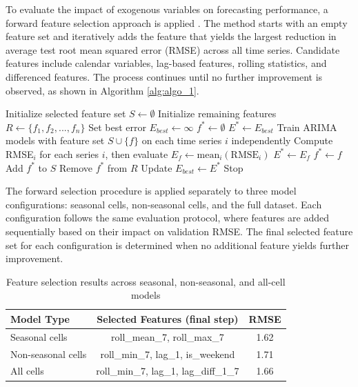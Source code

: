 To evaluate the impact of exogenous variables on forecasting performance, a forward feature selection approach is applied \cite{intro_to_ML}. The method starts with an empty feature set and iteratively adds the feature that yields the largest reduction in average test root mean squared error (RMSE) across all time series. Candidate features include calendar variables, lag-based features, rolling statistics, and differenced features. The process continues until no further improvement is observed, as shown in Algorithm \ref{alg:algo_1}.\\

\begin{algorithm}[H]\caption{Forward Feature Selection for ARIMA with Exogenous features}
\begin{algorithmic}[1]
	\STATE Initialize selected feature set $S \leftarrow \emptyset$
	\STATE Initialize remaining features $R \leftarrow \{f_1, f_2, ..., f_n\}$
	\STATE Set best error $E_{best} \leftarrow \infty$
	\STATE $f^* \leftarrow \emptyset$
	\STATE $E^* \leftarrow E_{best}$
	\STATE Train ARIMA models with feature set $S \cup \{f\}$ on each time series $i$ independently
	\STATE Compute RMSE$_i$ for each series $i$, then evaluate $E_f \leftarrow \text{mean}_i(\text{RMSE}_i)$
	\STATE $E^* \leftarrow E_f$
	\STATE $f^* \leftarrow f$
	\ENDIF
	\ENDFOR
	\STATE Add $f^*$ to $S$
	\STATE Remove $f^*$ from $R$
	\STATE Update $E_{best} \leftarrow E^*$
	\ELSE
	\STATE Stop
	\ENDIF
	\ENDWHILE
\end{algorithmic}
\label{alg:algo_1}
\end{algorithm}

The forward selection procedure is applied separately to three model configurations: seasonal cells, non-seasonal cells, and the full dataset. Each configuration follows the same evaluation protocol, where features are added sequentially based on their impact on validation RMSE. The final selected feature set for each configuration is determined when no additional feature yields further improvement. \\
\begin{table}[htbp]
\centering
\caption{Feature selection results across seasonal, non-seasonal, and all-cell models}
\label{tab:feature_selection_all}

\begin{tabular}{lcc}
\toprule
\textbf{Model Type} & \textbf{Selected Features (final step)} & \textbf{RMSE} \\
\midrule
Seasonal cells & roll\_mean\_7, roll\_max\_7 & 1.62 \\
Non-seasonal cells & roll\_min\_7, lag\_1, is\_weekend & 1.71 \\
All cells & roll\_min\_7, lag\_1, lag\_diff\_1\_7 & 1.66 \\
\bottomrule
\end{tabular}
\end{table}


